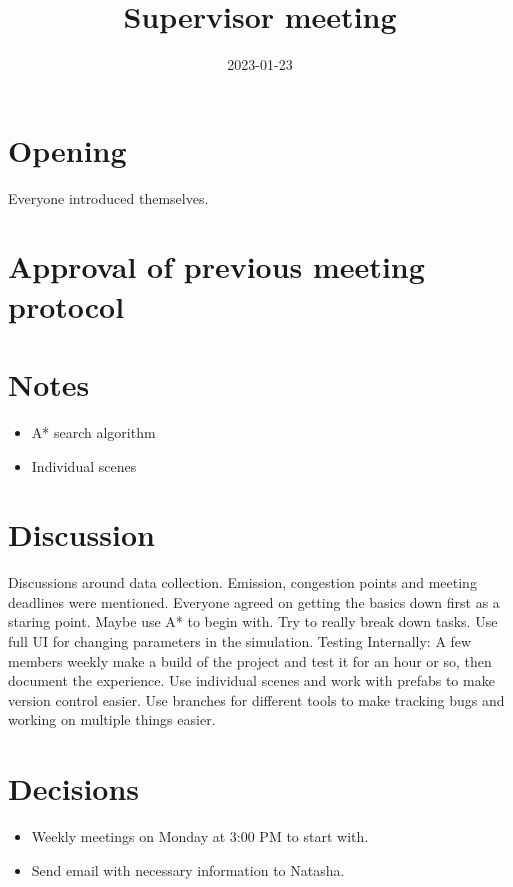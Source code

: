 \documentclass{article}
\newcommand{\meetingdate}{2023-01-23}
\newcommand{\meetingtime}{14:00}
\newcommand{\meetingtitle}{Supervisor meeting}
\newcommand{\attendees}{\martin \and \felix \and \hannes \and \marcus \and \jakob}
\begin{document}
    \begin{titlepage}
        \title{\meetingtitle}
        \date{\meetingdate}
        \maketitle
        
        \thispagestyle{first}
        
        \timeanddate{\meetingdate \space \meetingtime}
        \called{\members}
        \attended{\attendees}
    \end{titlepage}
    \newpage
    \pagestyle{fancy}

    \section{Opening}
        Everyone introduced themselves.

    \section{Approval of previous meeting protocol}
        
    \section{Notes}
        \begin{itemize}
            \item A* search algorithm
            \item Individual scenes
        \end{itemize}

    \section{Discussion}
        Discussions around data collection. Emission, congestion points and meeting deadlines were mentioned. Everyone agreed on getting the basics down first as a staring point. Maybe use A* to begin with. Try to really break down tasks. Use full UI for changing parameters in the simulation. Testing Internally: A few members weekly make a build of the project and test it for an hour or so, then document the experience. Use individual scenes and work with prefabs to make version control easier. Use branches for different tools to make tracking bugs and working on multiple things easier.

    \section{Decisions}
    \begin{itemize}
        \item Weekly meetings on Monday at 3:00 PM to start with.
        \item Send email with necessary information to Natasha.
    \end{itemize} 
    
\end{document}
